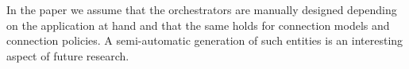 In the paper we assume that the orchestrators are manually designed depending on the application at hand and that the same holds for connection models and connection policies.
A semi-automatic generation of such entities is an interesting aspect of future research.

   
  







